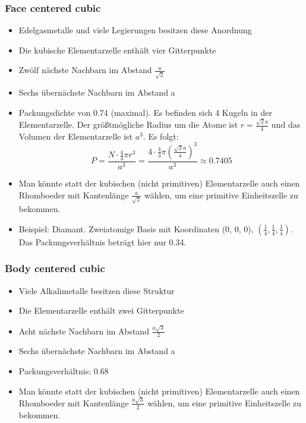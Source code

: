 \documentclass[11pt]{article}
\begin{document}
\subsubsection{Face centered cubic}
\begin{itemize}
  \item Edelgasmetalle und viele Legierungen besitzen diese Anordnung
  \item Die kubische Elementarzelle enthält vier Gitterpunkte
  \item Zwölf nächste Nachbarn im Abstand $\frac{a}{\sqrt{2}}$
  \item Sechs übernächste Nachbarn im Abstand a
  \item Packungsdichte von 0.74 (maximal). Es befinden sich 4 Kugeln in der
  Elementarzelle. Der größtmögliche Radius um die Atome ist $r=\frac{\sqrt{2}a}
  {4}$ und das Volumen der Elementarzelle ist $a^3$. Es folgt:
  \begin{equation}
    P=\frac{N\cdot\frac{4}{3}\pi r^3}{a^3}=
    \frac{4\cdot\frac{4}{3}\pi\left(\frac{\sqrt{2}a}{4}\right)^3}{a^3}
    \approx 0.7405
  \end{equation}
  \item Man könnte statt der kubischen (nicht primitiven) Elementarzelle auch
  einen Rhomboeder mit Kantenlänge $\frac{a}{\sqrt{2}}$ wählen, um eine
  primitive Einheitszelle zu bekommen.
  \item Beispiel: Diamant. Zweiatomige Basis mit Koordinaten (0, 0, 0),
  $(\frac{1}{4}, \frac{1}{4}, \frac{1}{4})$. Das Packungsverhältnis beträgt hier
  nur 0.34.
\end{itemize}
\subsubsection{Body centered cubic}
\begin{itemize}
  \item Viele Alkalimetalle besitzen diese Struktur
  \item Die Elementarzelle enthält zwei Gitterpunkte
  \item Acht nächste Nachbarn im Abstand $\frac{a\sqrt{3}}{2}$
  \item Sechs übernächste Nachbarn im Abstand a
  \item Packungsverhältnis: 0.68
  \item Man könnte statt der kubischen (nicht primitiven) Elementarzelle auch
  einen Rhomboeder mit Kantenlänge $\frac{a\sqrt{3}}{2}$ wählen, um eine
  primitive Einheitszelle zu bekommen.
\end{itemize}
\end{document}
